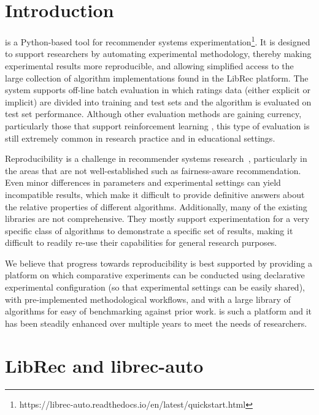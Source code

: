 \section{Introduction}
\label{sec:librec_intro}

\libauto{} is a Python-based tool for recommender systems experimentation\footnote{https://librec-auto.readthedocs.io/en/latest/quickstart.html}. It is designed to support researchers by automating experimental methodology, thereby making experimental results more reproducible, and allowing simplified access to the large collection of algorithm implementations found in the LibRec platform. The system supports off-line batch evaluation in which ratings data (either explicit or implicit) are divided into training and test sets and the algorithm is evaluated on test set performance. Although other evaluation methods are gaining currency, particularly those that support reinforcement learning \cite{joachims2018reveal,joachims2019reveal,joachims2020reveal}, this type of evaluation is still extremely common in research practice and in educational settings. 

Reproducibility is a challenge in recommender systems research~\cite{said2014comparative,beel2016towards,sun2020we}, particularly in the areas that are not well-established such as fairness-aware recommendation. Even minor differences in parameters and experimental settings can yield incompatible results, which make it difficult to provide definitive answers about the relative properties of different algorithms. Additionally, many of the existing libraries are not comprehensive. They mostly support experimentation for a very specific class of algorithms to demonstrate a specific set of results, making it difficult to readily re-use their capabilities for general research purposes. 

We believe that progress towards reproducibility is best supported by providing a platform on which comparative experiments can be conducted using declarative experimental configuration (so that experimental settings can be easily shared), with pre-implemented methodological workflows, and with a large library of algorithms for easy of benchmarking against prior work. \libauto{} is such a platform and it has been steadily enhanced over multiple years to meet the needs of researchers.


\section{LibRec and librec-auto}
\label{sec:libauto}

